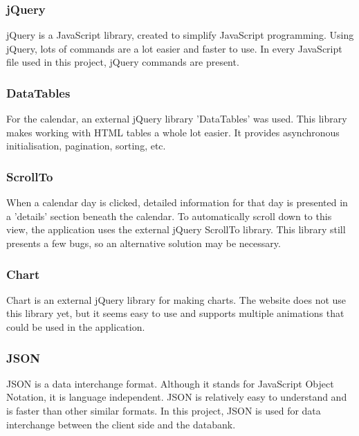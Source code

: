 \subsubsection{jQuery}
jQuery is a JavaScript library, created to simplify JavaScript programming. Using jQuery,
lots of commands are a lot easier and faster to use. In every JavaScript file used in this
project, jQuery commands are present.

\subsubsection{DataTables} 
For the calendar, an external jQuery library 'DataTables' was used. This library makes
working with HTML tables a whole lot easier. It provides asynchronous initialisation,
pagination, sorting, etc.

\subsubsection{ScrollTo}
When a calendar day is clicked, detailed information for that day is presented in a
'details' section beneath the calendar. To automatically scroll down to this view, the application
uses the external jQuery ScrollTo library. This library still presents a few bugs, so an alternative
solution may be necessary.

\subsubsection{Chart}
Chart is an external jQuery library for making charts. The website does not use this library yet,
but it seems easy to use and supports multiple animations that could be used in the application.

\subsubsection{JSON}
JSON is a data interchange format. Although it stands for JavaScript Object Notation, it
is language independent. JSON is relatively easy to understand and is faster than other
similar formats. In this project, JSON is used for data interchange between the client
side and the databank.
